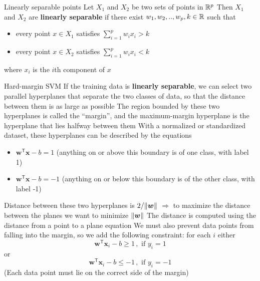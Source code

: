 \documentclass[aspectratio=169]{beamer}\usepackage[]{graphicx}\usepackage[]{xcolor}
\begin{document}
\begin{frame}{Linearly separable points}
    Let $X_1$ and $X_2$ be two sets of points in $\mathbb{R}^p$ 
    \vfill
    Then $X_1$ and $X_2$ are \textbf{linearly separable} if there exist $w_{1}, w_{2},..,w_{p}, k\in\mathbb{R}$ such that 
    \begin{itemize}
        \item every point $x \in X_1$ satisfies $\sum^{p}_{i=1} w_{i}x_{i} > k$ 
        \item every point $x \in X_2$ satisfies $\sum^{p}_{i=1} w_{i}x_{i} < k$
    \end{itemize}
    where $x_{i}$ is the $i$th component of $x$
\end{frame}

\begin{frame}{Hard-margin SVM}
    If the training data is \textbf{linearly separable}, we can select two parallel hyperplanes that separate the two classes of data, so that the distance between them is as large as possible 
    \vfill
    The region bounded by these two hyperplanes is called the ``margin'', and the maximum-margin hyperplane is the hyperplane that lies halfway between them
    \vfill
    With a normalized or standardized dataset, these hyperplanes can be described by the equations
    \begin{itemize}
        \item $\mathbf{w}^\mathsf{T} \mathbf{x} - b = 1$ (anything on or above this boundary is of one class, with label 1) 
        \item $\mathbf{w}^\mathsf{T} \mathbf{x} - b = -1$ (anything on or below this boundary is of the other class, with label -1)
    \end{itemize}
\end{frame}

\begin{frame}
    Distance between these two hyperplanes is $2/\|\bm{w}\|$
    \vfill
    $\Rightarrow$ to maximize the distance between the planes we want to minimize $\|\bm{w}\|$
    \vfill
    The distance is computed using the distance from a point to a plane equation
    \vfill
    We must also prevent data points from falling into the margin, so we add the following constraint: for each $i$ either
    \[
        \mathbf{w}^\mathsf{T} \mathbf{x}_i - b \ge 1 \, , \text{ if } y_i = 1
    \]
    or
    \[
        \mathbf{w}^\mathsf{T} \mathbf{x}_i - b \le -1 \, , \text{ if } y_i = -1
    \]
    \vfill
    (Each data point must lie on the correct side of the margin)
\end{frame}
\end{document}
